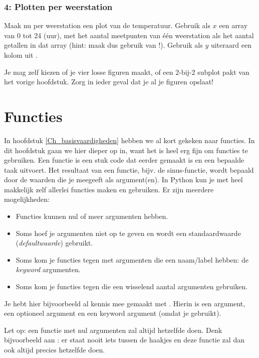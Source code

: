 \documentclass[a4paper,11pt, fleqn]{article}
\newcommand{\ditwc}{Naam van het huidige werkcollege}
\begin{document}
\subsubsection*{4: Plotten per weerstation}
Maak nu per weerstation een plot van de temperatuur. Gebruik als $x$ een array van 0 tot 24 (uur), met het aantal meetpunten van \'e\'en weerstation als het aantal getallen in dat array (hint: maak dus gebruik van !). Gebruik als $y$ uiteraard een kolom uit .

Je mag zelf kiezen of je vier losse figuren maakt, of een 2-bij-2 subplot pakt van het vorige hoofdstuk. Zorg in ieder geval dat je al je figuren opslaat!

\clearpage
\renewcommand{\ditwc}{Functies}
\section[Functies]{\ditwc}
In hoofdstuk \ref{Ch_basisvaardigheden} hebben we al kort gekeken naar functies. In dit hoofdstuk gaan we hier dieper op in, want het is heel erg fijn om functies te gebruiken. Een functie is een stuk code dat eerder gemaakt is en een bepaalde taak uitvoert. Het resultaat van een functie, bijv. de sinus-functie, wordt bepaald door de waarden die je meegeeft als argument(en). In Python kun je met  heel makkelijk zelf allerlei functies maken en gebruiken. Er zijn meerdere mogelijkheden:

\begin{itemize}
\item Functies kunnen nul of meer argumenten hebben. 
\item Soms hoef je argumenten niet op te geven en wordt een standaardwaarde (\textit{defaultwaarde}) gebruikt.
\item Soms kom je functies tegen met argumenten die een naam/label hebben: de \textit{keyword} argumenten. 
\item Soms kom je functies tegen die een wisselend aantal argumenten gebruiken.
\end{itemize}

Je hebt  hier bijvoorbeeld al kennis mee gemaakt met . Hierin is  een argument,  een optioneel argument en  een keyword argument (omdat je  gebruikt).

Let op: een functie met nul argumenten zal altijd hetzelfde doen. Denk bijvoorbeeld aan : er staat nooit iets tussen de haakjes en deze functie zal dan ook altijd precies hetzelfde doen.
\end{document}
